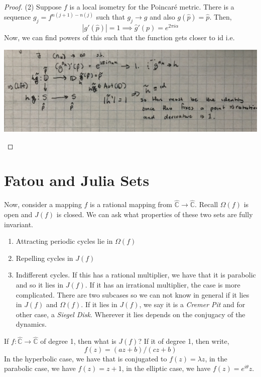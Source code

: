 \documentclass[a4paper, 11pt]{book}
\theoremstyle{definition}
\theoremstyle{remark}
\begin{document}
\begin{proof}
        (2) Suppose $f$ is a local isometry for the Poincaré metric. There is a sequence $g_j = f^{n(j+1)-n(j)}$ such that
        $g_j\to g$ and also $g(\hat{p}) = \hat{p}$. Then,
        \[ |g'(\hat{p})| = 1 \implies \hat{g}'(p) = e^{2\pi i\alpha} \]
        Now, we can find powers of this such that the function gets closer to id i.e.
        \begin{center}
            \includegraphics[scale=0.08]{IMG_1127}
        \end{center}
    \end{proof}

    \section{Fatou and Julia Sets}

    Now, consider a mapping $f$ is a rational mapping from $\hat{\mathbb{C}}\to\hat{\mathbb{C}}$. Recall $\Omega(f)$ is open and
    $J(f)$ is closed. We can ask what properties of these two sets are fully invariant.
    \begin{enumerate}
        \item Attracting periodic cycles lie in $\Omega(f)$
        \item Repelling cycles in $J(f)$
        \item Indifferent cycles. If this has a rational multiplier, we have that it is parabolic and so it lies in $J(f)$. If it has an
            irrational multiplier, the case is more complicated. There are two subcases so we can not know in general if it lies in $J(f)$
            and $\Omega(f)$. If it lies in $J(f)$, we say it is a \textit{Cremer Pit} and for other case, a \textit{Siegel Disk}. Wherever it
            lies depends on the conjugacy of the dynamics.
    \end{enumerate}

    If $f:\hat{\mathbb{C}}\to\hat{\mathbb{C}}$ of degree 1, then what is $J(f)$? If it of degree 1, then write,
    \[ f(z) = (az+b)/(cz+b) \]
    In the hyperbolic case, we have that is conjugated to $f(z) = \lambda z$, in the parabolic case, we have $f(z)=z+1$, in the elliptic case,
    we have $f(z) = e^{i\theta} z$.\\
\end{document}
